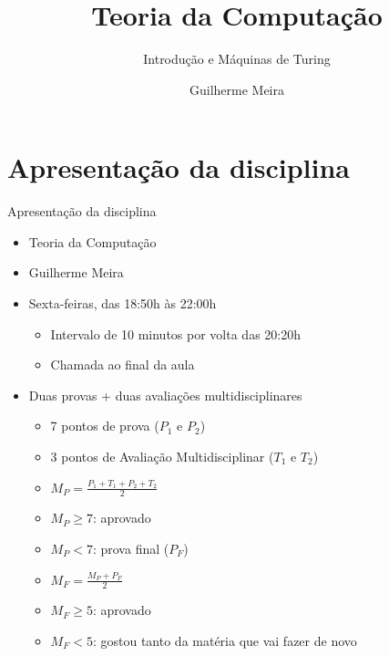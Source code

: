 \documentclass{beamer}
\title{Teoria da Computação} %
\subtitle{Introdução e Máquinas de Turing} %
\author{Guilherme Meira}
\begin{document}
  \frame{\maketitle}
  	
\section{Apresentação da disciplina}
\begin{frame}{Apresentação da disciplina}
   	\begin{itemize}
   		\item[Disciplina] Teoria da Computação
   		\item[Professor] Guilherme Meira
   		\item[Horário] Sexta-feiras, das 18:50h às 22:00h
   		\begin{itemize}
   			\item Intervalo de 10 minutos por volta das 20:20h
   			\item Chamada ao final da aula
   		\end{itemize}
   		\item[Avaliação] Duas provas + duas avaliações multidisciplinares
   		\begin{itemize}
   			\item 7 pontos de prova ($P_{1}$ e $P_{2}$)
   			\item 3 pontos de Avaliação Multidisciplinar ($T_{1}$ e $T_{2}$)
   			\item $M_{P} = \frac{P_{1} + T_{1} + P_{2} + T_{2}}{2}$
   			\item $M_{P} \ge 7$: aprovado
   			\item $M_{P} < 7$: prova final ($P_{F}$)
   			\item $M_{F} = \frac{M_{P} + P_{F}}{2}$
   			\item $M_{F} \ge 5$: aprovado
   			\item $M_{F} < 5$: gostou  tanto da matéria que vai fazer de novo
   		\end{itemize}
   	\end{itemize}
\end{frame}
\end{document}
